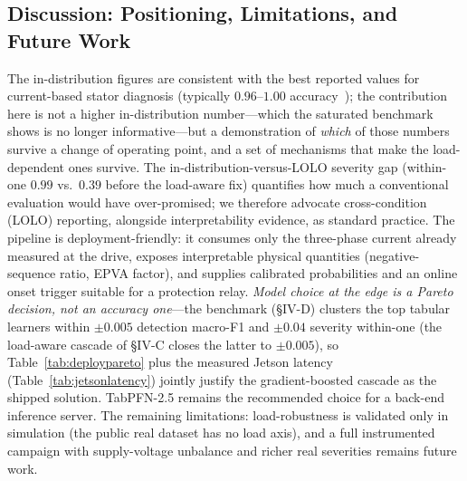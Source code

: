 \documentclass[journal]{IEEEtran}
\begin{document}
\subsection{Discussion: Positioning, Limitations, and Future Work}
The in-distribution figures are consistent with the best reported values for current-based stator
diagnosis (typically $0.96$--$1.00$ accuracy~\cite{hussain2025,pietrzak2022,aasar2026}); the
contribution here is not a higher in-distribution number---which the saturated benchmark shows is no
longer informative---but a demonstration of \emph{which} of those numbers survive a change of operating
point, and a set of mechanisms that make the load-dependent ones survive. The in-distribution-versus-LOLO
severity gap (within-one $0.99$ vs.\ $0.39$ before the load-aware fix) quantifies how much a conventional
evaluation would have over-promised; we therefore advocate cross-condition (LOLO) reporting, alongside
interpretability evidence, as standard practice. The pipeline is deployment-friendly: it
consumes only the three-phase current already measured at the drive, exposes interpretable
physical quantities (negative-sequence ratio, EPVA factor), and supplies calibrated
probabilities and an online onset trigger suitable for a protection relay. \emph{Model
choice at the edge is a Pareto decision, not an accuracy one}---the benchmark (\S IV-D)
clusters the top tabular learners within $\pm 0.005$ detection macro-F1 and $\pm 0.04$
severity within-one (the load-aware cascade of \S IV-C closes the latter to $\pm 0.005$),
so Table~\ref{tab:deploypareto} plus the measured Jetson latency
(Table~\ref{tab:jetsonlatency}) jointly justify the gradient-boosted cascade as the
shipped solution. TabPFN-2.5 remains the recommended choice for a back-end inference
server. The remaining limitations: load-robustness is validated only in simulation (the
public real dataset has no load axis), and a full instrumented campaign with
supply-voltage unbalance and richer real severities remains future work.
\end{document}
